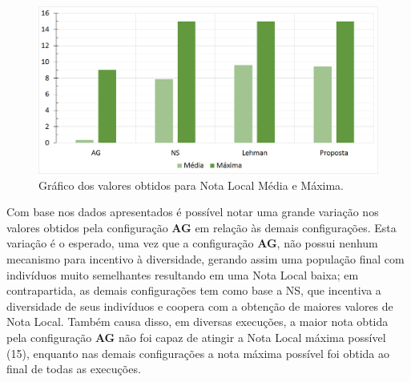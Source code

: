 \begin{table}[htb]
\centering
\caption{Valores obtidos por cada configuração para Nota Local.}
\label{tab:test_local_comp}
\end{table}

\begin{figure}[htb]
	\begin{center}
		\includegraphics[width=1\textwidth]{Imagens/test_local_comp.png}
		\caption{Gráfico dos valores obtidos para Nota Local Média e Máxima.}
		\label{fig:test_local_comp}
	\end{center}
\end{figure}

Com base nos dados apresentados é possível notar uma grande variação nos valores obtidos pela configuração \textbf{AG} em relação às demais configurações. Esta variação é o esperado, uma vez que a configuração \textbf{AG}, não possui nenhum mecanismo para incentivo à diversidade, gerando assim uma população final com indivíduos muito semelhantes resultando em uma Nota Local baixa; em contrapartida, as demais configurações tem como base a NS, que incentiva a diversidade de seus indivíduos e coopera com a obtenção de maiores valores de Nota Local. Também causa disso, em diversas execuções, a maior nota obtida pela configuração \textbf{AG} não foi capaz de atingir a Nota Local máxima possível (15), enquanto nas demais configurações a nota máxima possível foi obtida ao final de todas as execuções.

